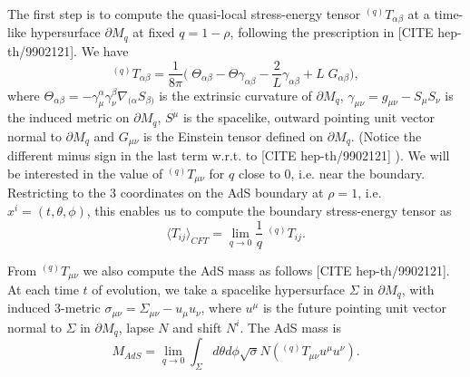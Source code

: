 \documentclass[12pt]{iopart} %
\begin{document}
The first step is to compute the quasi-local stress-energy tensor $^{(q)}T_{\alpha\beta}$ at a time-like hypersurface $\partial M_q$ at fixed $q=1-\rho$, following the prescription in  [CITE hep-th/9902121]. We have
\begin{equation}
^{(q)}T_{\alpha\beta}=\frac{1}{8\pi}\biggl(\;   \Theta_{\alpha\beta}-\Theta \gamma_{\alpha\beta}-\frac{2}{L}\gamma_{\alpha\beta}+L \;G_{\alpha\beta} \biggr),
\end{equation}
where $\Theta_{\alpha\beta}=-\gamma^\alpha_{\mu}\gamma^\beta_\nu\nabla_{(\alpha}S_{\beta)}$ is the extrinsic curvature of $\partial M_q$, $\gamma_{\mu\nu}=g_{\mu\nu}-S_\mu S_\nu$ is the induced metric on $\partial M_q$, $S^\mu$ is the spacelike, outward pointing unit vector normal to $\partial M_q$ and $G_{\mu\nu}$ is the Einstein tensor defined on $\partial M_q$. (Notice the different minus sign in the last term w.r.t. to  [CITE hep-th/9902121] ). We will be interested in the value of $^{(q)}T_{\mu\nu}$ for $q$ close to 0, i.e. near the boundary.
Restricting to the 3 coordinates on the AdS boundary at $\rho=1$, i.e. $x^i=(t,\theta,\phi)$, this enables us to compute the boundary stress-energy tensor as
\begin{equation}
\langle T_{ij}\rangle_{CFT}=\lim_{q\to0}\frac{1}{q}  \;^{(q)}T_{ij}.
\end{equation}

From $^{(q)}T_{\mu\nu}$ we also compute the AdS mass as follows [CITE hep-th/9902121]. At each time $t$ of evolution, we take a spacelike hypersurface $\Sigma$ in $\partial M_q$, with induced 3-metric $\sigma_{\mu\nu}=\Sigma_{\mu\nu}-u_\mu u_\nu$, where $u^\mu$ is the future pointing unit vector normal to $\Sigma$ in $\partial M_q$, lapse $N$ and shift $N^i$. The AdS mass is
\begin{equation}
M_{AdS}=\lim_{q\to0}\int_\Sigma d\theta d\phi \sqrt{\sigma} N ( ^{(q)}T_{\mu\nu} u^\mu u^\nu).
\end{equation}
\end{document}
